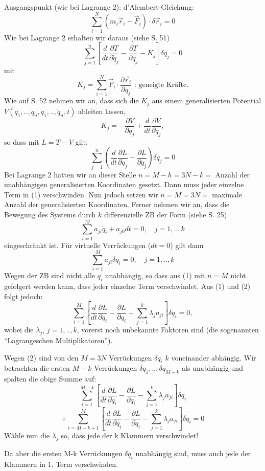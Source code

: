 \documentclass[10pt, letterpaper]{article}
\begin{document}
Ausgangspunkt (wie bei Lagrange 2): d'Alembert-Gleichung:
\[\sum_{i=1}^N (m_i\ddot{\vec{r}}_i-\vec{F}_i)\cdot\delta\vec{r}_i = 0\]
Wie bei Lagrange 2 erhalten wir daraus (siehe S. 51)
\[\sum_{j=1}^n \left[\frac{d}{dt}\frac{\partial T}{\partial \dot{q}_j} - \frac{\partial T}{\partial q_j} - K_j\right]\delta q_j = 0\]
mit \[K_j = \sum_{i=1}^N \vec{F}_i\cdot\frac{\partial \vec{r}_i}{\partial q_j} \text{ : geneigte Kräfte.}\]
Wie auf S. 52 nehmen wir an, dass sich die $K_j$ aus einem generalisierten Potential $V(q_1,..,q_n,\dot{q}_1,..,\dot{q}_n,t)$ ableiten lassen,
\[K_j = -\frac{\partial V}{\partial q_j} + \frac{d}{dt}\frac{\partial V}{\partial \dot{q}_j},\]
so dass mit $L = T-V$ gilt:
\[\sum_{j=1}^n \left(\frac{d}{dt}\frac{\partial L}{\partial \dot{q}_j} - \frac{\partial L}{\partial q_j}\right)\delta q_j = 0 \tag{1}\]
Bei Lagrange 2 hatten wir an dieser Stelle $n=M-h=3N-k =$ Anzahl der unabhängigen generalisierten Koordinaten gesetzt. Dann muss jeder einzelne Term in (1) verschwinden. Nun jedoch setzen wir $n=M=3N =$ maximale Anzahl der generalisierten Koordinaten. Ferner nehmen wir an, dass die Bewegung des Systems durch $k$ differenzielle ZB der Form (siehe S. 25)
\[\sum_{i=1}^M a_{ji} \dot{q}_i + a_{j0} dt = 0, \quad j=1,..,k\]
eingeschränkt ist. Für virtuelle Verrückungen ($dt=0$) gilt dann
\[\sum_{i=1}^M a_{ji} \delta q_i = 0, \quad j=1,..,k \tag{2}\]
Wegen der ZB sind nicht alle $q_i$ unabhängig, so dass aus (1) mit $n=M$ nicht gefolgert werden kann, dass jeder einzelne Term verschwindet. Aus (1) und (2) folgt jedoch:
\[\sum_{i=1}^M \left[\frac{d}{dt}\frac{\partial L}{\partial \dot{q}_i} - \frac{\partial L}{\partial q_i} - \sum_{j=1}^k \lambda_j a_{ji}\right]\delta q_i = 0,\]
wobei die $\lambda_j$, $j=1,..,k$, vorerst noch unbekannte Faktoren sind (die sogenannten ``Lagrangeschen Multiplikatoren'').

Wegen (2) sind von den $M=3N$ Verrückungen $\delta q_i$ $k$ voneinander abhängig. Wir betrachten die ersten $M-k$ Verrückungen $\delta q_1,..,\delta q_{M-k}$ als unabhängig und spalten die obige Summe auf:
\[\sum_{i=1}^{M-k} \left[\frac{d}{dt}\frac{\partial L}{\partial \dot{q}_i} - \frac{\partial L}{\partial q_i} - \sum_{j=1}^k \lambda_j a_{ji}\right]\delta q_i\]
\[+ \sum_{i=M-k+1}^M \left[\frac{d}{dt}\frac{\partial L}{\partial \dot{q}_i} - \frac{\partial L}{\partial q_i} - \sum_{j=1}^k \lambda_j a_{ji}\right]\delta q_i = 0\]
Wähle nun die $\lambda_j$ so, dass jede der k Klammern verschwindet!

Da aber die ersten M-k Verrückungen $\delta q_i$ unabhängig sind, muss auch jede der Klammern in 1. Term verschwinden.
\end{document}
